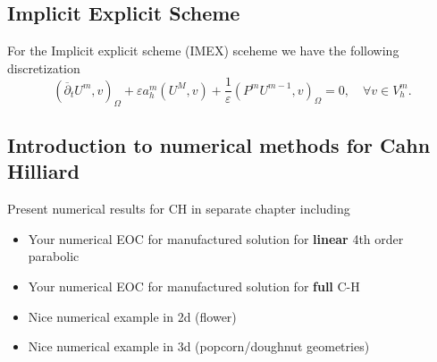 \subsection{Implicit Explicit Scheme}%
\label{sub:implicit_explicit_scheme}


For the Implicit explicit scheme (IMEX) sceheme we have the following discretization
\[
( \overline{\partial } _{t} U^{m}, v   )_{\Omega } + \varepsilon a^{m}_{h}( U^{M} , v) + \frac{1}{\varepsilon } ( P^{m} U^{m-1}, v) _{\Omega } =0, \quad \forall v \in V_{h}^{m}.
\]


\subsection{Introduction to numerical methods for Cahn Hilliard}%
\label{sub:introduction_to_numerical_methods_for_cahn_hilliard}

Present numerical results for CH in separate chapter including
\begin{itemize}
    \item Your numerical EOC for  manufactured solution for \textbf{linear} 4th order parabolic
    \item Your numerical EOC for  manufactured solution for \textbf{full} C-H
    \item Nice numerical example in 2d (flower)
    \item Nice numerical example in 3d (popcorn/doughnut geometries)
\end{itemize}


